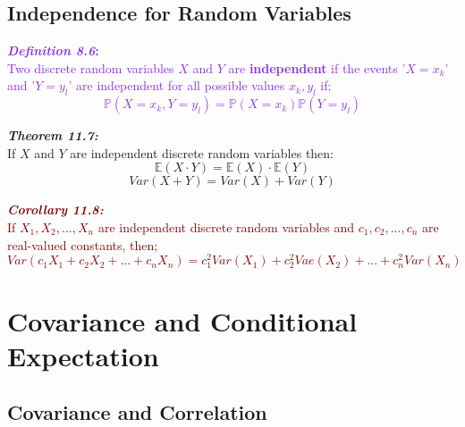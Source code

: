 \documentclass{report}
\newenvironment{cframed}[1][BlueViolet]
  {\begin{tcolorbox}[colframe=#1,colback=white]}
  {\end{tcolorbox}}
\newenvironment{cframed2}[1][PineGreen]
  {\begin{tcolorbox}[colframe=#1,colback=white]}
  {\end{tcolorbox}}
\newenvironment{cframedprop}[1][Maroon]
  {\begin{tcolorbox}[colframe=#1,colback=white]}
  {\end{tcolorbox}}
\begin{document}
\section{Independence for Random Variables}

\begin{cframed}
    \textcolor{BlueViolet}{\textbf{\textit{Definition 8.6}:}\\
    Two discrete random variables $X$ and $Y$ are \textbf{independent} if the events '$X = x_k$' and '$Y = y_l$' are independent for all possible values $x_k,y_l$ if;
    \begin{equation}
        \mathbb{P}(X = x_k, Y = y_l) = \mathbb{P}(X = x_k) \mathbb{P}(Y = y_l)
    \end{equation}}
\end{cframed}

\begin{cframed2}
    \textcolor{PineGreen}{\textbf{\textit{Theorem 11.7:}}\\
    If $X$ and $Y$ are independent discrete random variables then:
    \begin{equation}
        \mathbb{E}(X \cdot Y) = \mathbb{E}(X) \cdot \mathbb{E}(Y)
    \end{equation}
    \begin{equation}
        Var(X + Y) = Var(X) + Var(Y)
    \end{equation}}
\end{cframed2}


\begin{cframedprop}
    \textcolor{Maroon}{\textbf{\textit{Corollary 11.8:}}\\
    If $X_1,X_2,...,X_n$ are independent discrete random variables and $c_1,c_2,...,c_n$ are real-valued constants, then;
    \begin{equation}
        Var(c_1X_1 + c_2X_2 + ... + c_nX_n) = c_1^2Var(X_1) + c_2^2Vae(X_2) + ... + c_n^2Var(X_n)
    \end{equation}}
\end{cframedprop}

\chapter{Covariance and Conditional Expectation}
\section{Covariance and Correlation}
\end{document}
